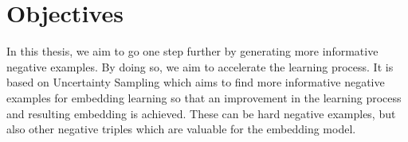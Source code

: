 \section{Objectives}

In this thesis, we aim to go one step further by generating more informative negative examples. 
By doing so, we aim to accelerate the learning process.
It is based on Uncertainty Sampling which aims to find more informative negative examples for embedding learning so that an improvement in the learning process and resulting embedding is achieved.
These can be hard negative examples, but also other negative triples which are valuable for the embedding model.